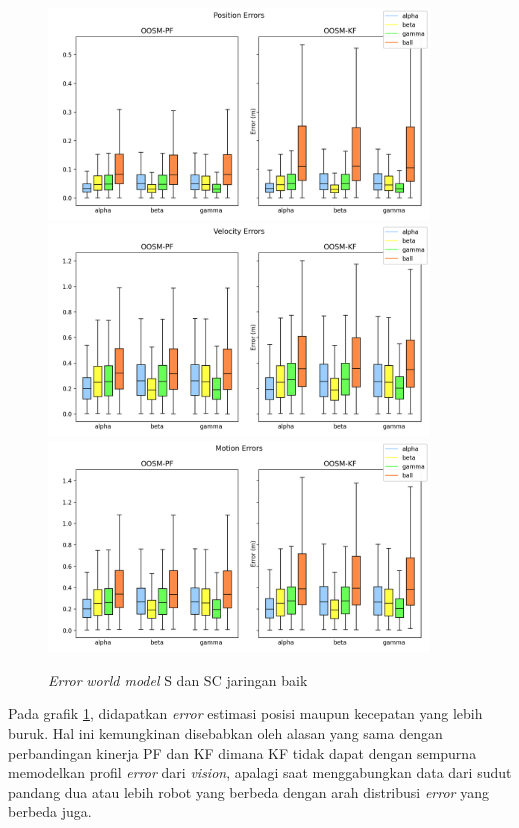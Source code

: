 \begin{figure}[p]
    \centering
    \medskip
    \includegraphics[width=0.9\textwidth]{resources/cfg1_AS_ASC_error_pos.png}
    \includegraphics[width=0.9\textwidth]{resources/cfg1_AS_ASC_error_vel.png}
    \includegraphics[width=0.9\textwidth]{resources/cfg1_AS_ASC_error_motion.png}
    \caption{\textit{Error} \textit{world model} S dan SC jaringan baik}
    \label{fig:1-s-sc-error}
    \bigskip
\end{figure}

Pada grafik \ref{fig:1-s-sc-error}, didapatkan \textit{error} estimasi posisi maupun kecepatan yang lebih buruk. Hal ini kemungkinan disebabkan oleh alasan yang sama dengan perbandingan kinerja PF dan KF dimana KF tidak dapat dengan sempurna memodelkan profil \textit{error} dari \textit{vision}, apalagi saat menggabungkan data dari sudut pandang dua atau lebih robot yang berbeda dengan arah distribusi \textit{error} yang berbeda juga.

